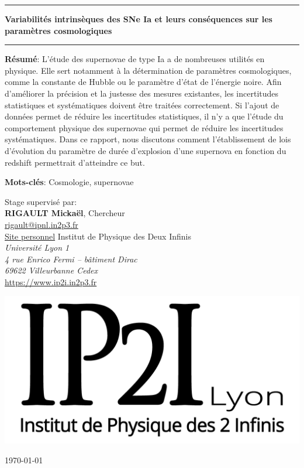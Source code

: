 \documentclass[a4paper, 12pt, svgnames]{article}
\begin{document}
\begin{center}\vfill\hrule\vspace*{8pt}

\textbf{\huge Variabilités intrinsèques des SNe Ia et leurs conséquences sur les
paramètres cosmologiques}\\

\hrule\vfill

\parbox{15cm}{\small\textbf{Résumé}:
L'étude des supernovae de type Ia a de nombreuses utilités en physique. Elle
sert notamment à la détermination de paramètres cosmologiques, comme la
constante de Hubble ou le paramètre d'état de l'énergie noire. Afin d'améliorer
la précision et la justesse des mesures existantes, les incertitudes
statistiques et systématiques doivent être traitées correctement. Si l'ajout de
données permet de réduire les incertitudes statistiques, il n'y a que l'étude du
comportement physique des supernovae qui permet de réduire les incertitudes
systématiques. Dans ce rapport, nous discutons comment l'établissement de lois
d'évolution du paramètre de durée d'explosion d'une supernova en fonction du
redshift permettrait d'atteindre ce but.}\vspace{0.5cm}

\parbox{15cm}{\small\textbf{Mots-clés}:
Cosmologie, supernovae}\vspace{0.5cm}

\parbox{15cm}{Stage supervisé par:\\
\textbf{\textsc{RIGAULT} Mickaël}, Chercheur\\
\href{mailto:rigault@ipnl.in2p3.fr}{rigault@ipnl.in2p3.fr}\\
\href{https://www.ipnl.in2p3.fr/perso/rigault/}{Site personnel}\bigbreak
Institut de Physique des Deux Infinis\\
{\textit{Université Lyon 1\\4 rue Enrico Fermi -- bâtiment Dirac\\
69622 Villeurbanne Cedex}}\\
\url{https://www.ip2i.in2p3.fr}}\vspace{.5cm}\vfill

\includegraphics[width=.3\textwidth]{General_figures/IP2I.png}
\end{center}\vfill \hfill \today
\newpage
\thispagestyle{empty}
\setcounter{page}{0}
\end{document}
